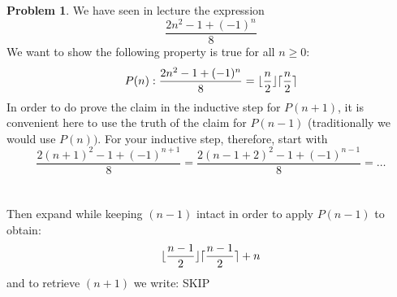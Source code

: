 \documentclass[10pt,leqno ]{article}
\theoremstyle{definition}
\newtheorem{problem}[theorem]{Problem}
\DeclarePairedDelimiter{\ceil}{\lceil}{\rceil}
\DeclarePairedDelimiter{\floor}{\lfloor}{\rfloor}
\begin{document}
\begin{problem} We have seen in lecture the expression
$$\frac{2n^2 - 1 +(-1)^n}{8}$$
We want to show the following property is true for all $n \geq 0$:
$$P(n): \frac{2n^2 - 1 + (-1)^n}{8} = \floor{\frac{n}{2}} \ceil{\frac{n}{2}}$$
In order to do prove the claim in the inductive step for $P(n+ 1)$, it is convenient here to use the truth of the claim for $P(n-1)$ (traditionally we would use $P(n))$.  For your inductive step, therefore, start with
$$\frac{2(n+1)^2 - 1 + (-1)^{n+1}}{8} = \frac{2(n-1+2)^2 - 1 + (-1)^{n-1}}{8} = \dots$$
\\\\
Then expand while keeping $(n-1)$ intact in order to apply $P(n-1)$ to obtain:
$$\floor{\frac{n-1}{2}} \ceil{\frac{n-1}{2}}+n$$
and to retrieve $(n+ 1)$ we write:
\Large
SKIP
\end{problem}
\end{document}
